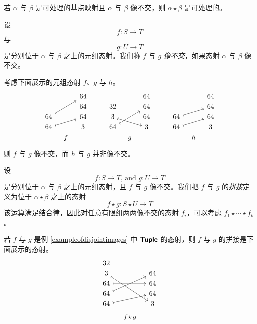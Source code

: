 \begin{remark}
    若 $\alpha$ 与 $\beta$ 是可处理的基点映射且 $\alpha$ 与 $\beta$ 像不交，则 $\alpha \star \beta$ 是可处理的。
\end{remark}

\begin{definition}\label{definitionofdisjointimagesinC} 设
\[
f:S \to T
\]
与
\[g:U \to T\]
是分别位于 $\alpha$ 与 $\beta$ 之上的元组态射。我们称 $f$ 与 $g$ {\it 像不交}，如果态射 $\alpha$ 与 $\beta$ 像不交。
\end{definition}

\begin{example}\label{exampleofdisjointimages}
    考虑下面展示的元组态射 $f$、$g$ 与 $h$。
    \[ \begin{tikzcd}[row sep = 1, column sep = 8]
    & & 64 & & & & & 64 & & & & & 64\\
     & & 64 & & & 32 & & 64 & & & & & 64\\
    64 \ar[rruu,mapsto] & & 64 & & &  3 \ar[rrd, mapsto] & & 64 & & & 64 \ar[urr,mapsto] & & 64\\
    64 \ar[rru,mapsto]& & 3 & & &  64 \ar[rruu,mapsto] & & 3 & & & 64 \ar[urr,mapsto] & & 3\\
    & f & & & & & g & & & & & h & \\
    \end{tikzcd} \]
    则 $f$ 与 $g$ 像不交，而 $h$ 与 $g$ 并非像不交。
\end{example}



\begin{construction}\label{constructionofflatconcatenation}
    设
    \[f:S \to T \text{, and }g:U \to T\]
    是分别位于 $\alpha$ 与 $\beta$ 之上的元组态射，且 $f$ 与 $g$ 像不交。我们把 $f$ 与 $g$ 的{\it 拼接}定义为位于 $\alpha \star \beta$ 之上的态射
    \[
    f \star g: S \star U \to T
    \]
    该运算满足结合律，因此对任意有限组两两像不交的态射 $f_i$，可以考虑 $f_1\star\cdots\star f_k$。
\end{construction}

\begin{example}\label{exampleofconcatenation}
    若 $f$ 与 $g$ 是例 \ref{exampleofdisjointimages} 中 ${\boldsymbol{\mathsf{Tuple}}}$ 的态射，则 $f$ 与 $g$ 的拼接是下面展示的态射。
    \[ \begin{tikzcd} [row sep = 1, column sep = 24]
    32 & & \\
    3 \ar[dddrr,mapsto]& & 64\\
    64 \ar[rr,mapsto] & & 64\\
    64 \ar[uurr,mapsto] & & 64 \\
    64 \ar[urr,mapsto] & & 3 \\
    \end{tikzcd}
    \]
    \[ f \star g \]
\end{example}

